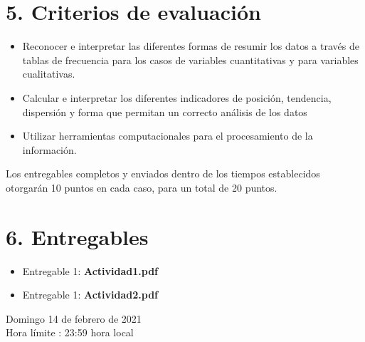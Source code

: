 \documentclass[base=hide,11pt]{elegantbook}
\begin{document}

 

\section*{5. Criterios de evaluación}

\begin{itemize}
	\item Reconocer e interpretar las diferentes formas  de resumir  los  datos  a través de tablas de frecuencia para los casos de variables cuantitativas y para variables cualitativas.
	\item Calcular e interpretar los diferentes indicadores de posición, tendencia, dispersión y forma que permitan un correcto análisis de los datos
	\item Utilizar herramientas computacionales para el procesamiento de la información. 
\end{itemize}

Los entregables completos y enviados dentro de los tiempos establecidos  otorgarán 10 puntos en cada caso, para un  total de 20 puntos. 



\section*{6. Entregables}

\begin{itemize}
\item Entregable 1: \textcolor{col3}{\bf Actividad1.pdf}
\item Entregable 1: \textcolor{col3}{\bf Actividad2.pdf}  	
\end{itemize}
\vspace{1cm}

Domingo 14 de febrero de 2021\\
Hora límite : 23:59  hora  local


\end{document}
